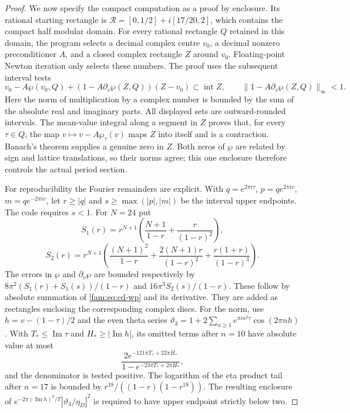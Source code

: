 \begin{proof}
We now specify the compact computation as a proof by enclosure.
Its rational starting rectangle is
$\mathcal R=[0,1/2]+i[17/20,2]$, which contains the compact half modular
domain. For every rational rectangle $Q$ retained in this domain, the
program selects a decimal complex centre $v_0$, a decimal nonzero
preconditioner $A$, and a closed complex rectangle $Z$ around $v_0$.
Floating-point Newton iteration only selects these numbers. The proof
uses the subsequent interval tests
\[
 v_0-A\wp(v_0,Q)+(1-A\partial_v\wp(Z,Q))(Z-v_0)
       \subset\operatorname{int}Z,
 \qquad
 \|1-A\partial_v\wp(Z,Q)\|_\infty<1.
\]
Here the norm of multiplication by a complex number is bounded by the
sum of the absolute real and imaginary parts. All displayed sets are
outward-rounded intervals. The mean-value integral along a segment in
$Z$ proves that, for every $\tau\in Q$, the map
$v\mapsto v-A\wp_\tau(v)$ maps $Z$ into itself and is a contraction.
Banach's theorem supplies a genuine zero in $Z$. Both zeros of $\wp$
are related by sign and lattice translations, so their norms agree;
this one enclosure therefore controls the actual period section.

For reproducibility the Fourier remainders are explicit. With
$q=e^{2\pi i\tau}$, $p=q e^{2\pi iv}$, $m=q e^{-2\pi iv}$, let
$r\geq|q|$ and $s\geq\max(|p|,|m|)$ be the interval upper endpoints.
The code requires $s<1$. For $N=24$ put
\[
 S_1(r)=r^{N+1}\left(\frac{N+1}{1-r}+\frac r{(1-r)^2}\right),
\]
\[
 S_2(r)=r^{N+1}\left(\frac{(N+1)^2}{1-r}+
 \frac{2(N+1)r}{(1-r)^2}+\frac{r(1+r)}{(1-r)^3}\right).
\]
The errors in $\wp$ and $\partial_v\wp$ are bounded respectively by
$8\pi^2(S_1(r)+S_1(s))/(1-r)$ and $16\pi^3S_2(s)/(1-r)$.
These follow by absolute summation of \eqref{fam:eq:cd-wp} and its derivative.
They are added as rectangles enclosing the corresponding complex discs.
For the norm, use $h=v-(1-\tau)/2$ and the even theta series
$\vartheta_3=1+2\sum_{n\geq1}e^{\pi i n^2\tau}\cos(2\pi nh)$.
With $T_*\leq\operatorname{Im}\tau$ and $H_*\geq|\operatorname{Im}h|$,
its omitted terms after $n=10$ have absolute value at most
\[
 \frac{2e^{-121\pi T_*+22\pi H_*}}
 {1-e^{-23\pi T_*+2\pi H_*}},
\]
and the denominator is tested positive. The logarithm of the eta
product tail after $n=17$ is bounded by
$r^{18}/((1-r)(1-r^{18}))$. The resulting enclosure of
$e^{-2\pi(\operatorname{Im}h)^2/T}|\vartheta_3/\eta_D|^2$
is required to have upper endpoint strictly below two.


\end{proof}
